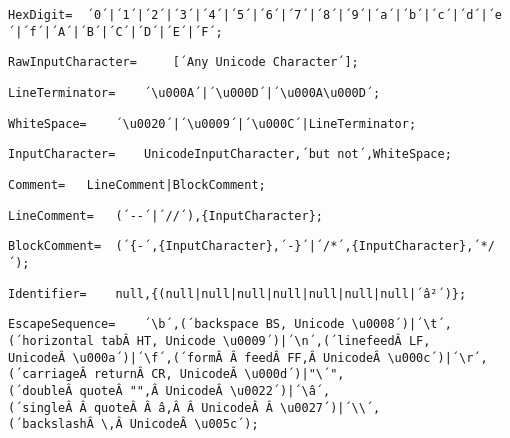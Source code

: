 \documentclass{article}
\begin{document}
    \begin{lstlisting}[mathescape=true]
     HexDigit= 	´0´|´1´|´2´|´3´|´4´|´5´|´6´|´7´|´8´|´9´|´a´|´b´|´c´|´d´|´e´|´f´|´A´|´B´|´C´|´D´|´E´|´F´;
    \end{lstlisting}
    
    \begin{lstlisting}[mathescape=true]
     RawInputCharacter= 	[´Any Unicode Character´];
    \end{lstlisting}
    
    \begin{lstlisting}[mathescape=true]
     LineTerminator= 	´\u000A´|´\u000D´|´\u000A\u000D´;
    \end{lstlisting}
    
    \begin{lstlisting}[mathescape=true]
     WhiteSpace= 	´\u0020´|´\u0009´|´\u000C´|LineTerminator;
    \end{lstlisting}
    
    \begin{lstlisting}[mathescape=true]
     InputCharacter= 	UnicodeInputCharacter,´but not´,WhiteSpace;
    \end{lstlisting}
    
    \begin{lstlisting}[mathescape=true]
     Comment= 	LineComment|BlockComment;
    \end{lstlisting}
    
    \begin{lstlisting}[mathescape=true]
     LineComment= 	(´--´|´//´),{InputCharacter};
    \end{lstlisting}
    
    \begin{lstlisting}[mathescape=true]
     BlockComment= 	(´{-´,{InputCharacter},´-}´|´/*´,{InputCharacter},´*/´);
    \end{lstlisting}
    
    \begin{lstlisting}[mathescape=true]
     Identifier= 	null,{(null|null|null|null|null|null|null|´â²´)};
    \end{lstlisting}
    
    \begin{lstlisting}[mathescape=true]
     EscapeSequence= 	´\b´,(´backspace BS, Unicode \u0008´)|´\t´,(´horizontal tabÂ HT, Unicode \u0009´)|´\n´,(´linefeedÂ LF, UnicodeÂ \u000a´)|´\f´,(´formÂ Â feedÂ FF,Â UnicodeÂ \u000c´)|´\r´,(´carriageÂ returnÂ CR, UnicodeÂ \u000d´)|"\´",(´doubleÂ quoteÂ "",Â UnicodeÂ \u0022´)|´\â´,(´singleÂ Â quoteÂ Â â,Â Â UnicodeÂ Â \u0027´)|´\\´,(´backslashÂ \,Â UnicodeÂ \u005c´);
    \end{lstlisting}
    
\end{document}
